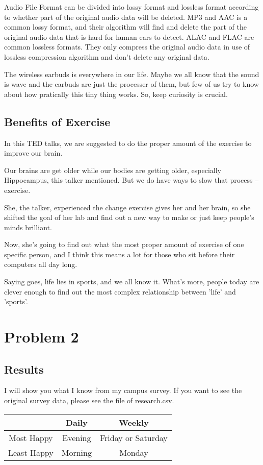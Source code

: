 \documentclass{article}
\begin{document}
Audio File Format can be divided into lossy format and lossless format according to whether part of the original audio data will be deleted. MP3 and AAC is a common lossy format, and their algorithm will find and delete the part of the original audio data that is hard for human ears to detect. ALAC and FLAC are common lossless formats. They only compress the original audio data in use of lossless compression algorithm and don't delete any original data.

The wireless earbuds is everywhere in our life. Maybe we all know that the sound is wave and the earbuds are just the processer of them, but few of us try to know about how pratically this tiny thing works. So, keep curiosity is crucial.

\subsection{Benefits of Exercise}

In this TED talks, we are suggested to do the proper amount of the exercise to improve our brain.

Our brains are get older while our bodies are getting older, especially Hippocampus, this talker mentioned. But we do have ways to slow that process -- exercise.

She, the talker, experienced the change exercise gives her and her brain, so she shifted the goal of her lab and find out a new way to make or just keep people's minds brilliant. 

Now, she's going to find out what the most proper amount of exercise of one specific person, and I think this means a lot for those who sit before their computers all day long.

Saying goes, life lies in sports, and we all know it. What's more, people today are clever enough to find out the most complex relationship between 'life' and 'sports'.

\section{Problem 2}

\subsection{Results}
I will show you what I know from my campus survey. If you want to see the original survey data, please see the file of research.csv.

\begin{tabular}{ccc}
    \toprule %
    \centering
    &Daily  &  Weekly \\ %
    \midrule %
    Most Happy & Evening & Friday or Saturday \\
    Least Happy & Morning &Monday \\
    \bottomrule %
    \end{tabular}
\end{document}

